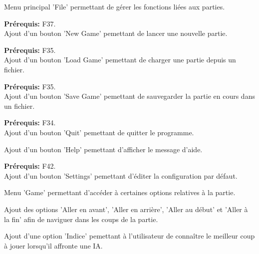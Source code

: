 \documentclass{article}
\begin{document}
\begin{needbox}
    Menu principal 'File' permettant de gérer les fonctions liées aux parties.
    \begin{subneedbox}
        \textbf{Prérequis:} F37.\\
        Ajout d'un bouton 'New Game' pemettant de lancer une nouvelle partie.
    \end{subneedbox}
    \begin{subneedbox}
        \textbf{Prérequis:} F35.\\
        Ajout d'un bouton 'Load Game' pemettant de charger une partie depuis un fichier.
    \end{subneedbox}
    \begin{subneedbox}
        \textbf{Prérequis:} F35.\\
        Ajout d'un bouton 'Save Game' pemettant de sauvegarder la partie en cours dans un fichier.
    \end{subneedbox}
    \begin{subneedbox}[F47.4: Quit]
        \textbf{Prérequis:} F34.\\
        Ajout d'un bouton 'Quit' pemettant de quitter le programme.
    \end{subneedbox}
    \begin{subneedbox}[F47.5: Help]
        Ajout d'un bouton 'Help' pemettant d'afficher le message d'aide.
    \end{subneedbox}
    \begin{subneedbox}[F47.6: Settings]
        \textbf{Prérequis:} F42.\\
        Ajout d'un bouton 'Settings' pemettant d'éditer la configuration par défaut.
    \end{subneedbox}
\end{needbox}

\begin{needbox}
    Menu 'Game' permettant d'accéder à certaines options relatives à la partie.
    \begin{subneedbox}
        Ajout des options 'Aller en avant', 'Aller en arrière', 'Aller au début' et 'Aller à la fin' afin de naviguer dans
        les coups de la partie.
    \end{subneedbox}
    \begin{subneedbox}[F48.2: Indice]
        Ajout d'une option 'Indice' pemettant à l'utilisateur de connaître le meilleur coup à jouer lorsqu'il
        affronte une IA.
    \end{subneedbox}
\end{needbox}
\end{document}
